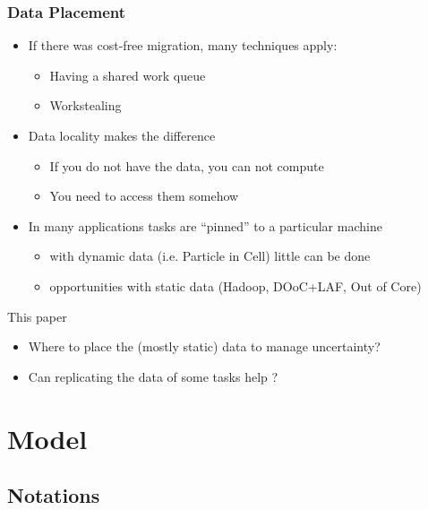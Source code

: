 \documentclass[usenames,dvipsnames]{beamer}
\begin{document}
\begin{frame}
  \frametitle{Data Placement}
  
  \begin{itemize}
  \item If there was cost-free migration, many techniques apply:
    \begin{itemize}
    \item Having a shared work queue
    \item Workstealing
    \end{itemize}
  \item Data locality makes the difference
    \begin{itemize}
      \item If you do not have the data, you can not compute
      \item You need to access them somehow
    \end{itemize}
  \item In many applications tasks are ``pinned'' to a particular machine
    \begin{itemize}
    \item with dynamic data (i.e. Particle in Cell) little can be done
    \item opportunities with static data (Hadoop, DOoC+LAF, Out of Core)
    \end{itemize}
  \end{itemize}

  \pause
  
  \begin{block}{This paper}
    \begin{itemize}
    \item Where to place the (mostly static) data to manage uncertainty?
    \item Can replicating the data of some tasks help ?
    \end{itemize}
  \end{block}
\end{frame}

\section{Model}

\subsection{Notations}
\end{document}
